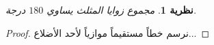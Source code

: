 ﻿\documentclass{article}
\newtheorem{theorem}{نظرية}
\begin{document}
\begin{theorem}
مجموع زوايا المثلث يساوي $180$ درجة.
\end{theorem}
\begin{proof}
نرسم خطاً مستقيماً موازياً لأحد الأضلاع...
\end{proof}
\end{document}
